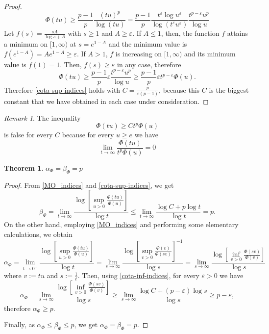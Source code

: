 \documentclass[twoside]{article}
\newtheorem{thm}{Theorem}[section]
\theoremstyle{remark}
\newtheorem{comentario}{Remark}
\renewcommand{\leq}{\leqslant}
\renewcommand{\geq}{\geqslant}
\begin{document}
\begin{proof}
\[
  \Phi(tu)
  \geq
  \frac{p-1}{p}\frac{(tu)^p}{\log(tu)}
  =
  \frac{p-1}{p}
  \frac{t^{\varepsilon} \log u^{\varepsilon}}{\log(t^{\varepsilon}u^{\varepsilon})}
  \frac{t^{p-\varepsilon}u^p}{\log u}
\]
Let $f(s)=\frac{sA}{\log s+A}$ with $s\geq 1$ and $A\geq \varepsilon$.  If $A\leq 1$, then, the function $f$ attains a minimum on $[1,\infty)$ at $s=e^{1-A}$ and the minimum value is $f(e^{1-A})=Ae^{1-A}\geq \varepsilon$. If $A> 1$, $f$ is increasing  on $[1,\infty)$ and its minimum value is $f(1)=1$. Then, $f(s)\geq \varepsilon$ in any case,   therefore
\[
\Phi(tu)\geq \frac{p-1}{p}\varepsilon \frac{t^{p-\varepsilon}u^p}{\log u}\geq
\frac{p-1}{p}\varepsilon t^{p-\varepsilon}\Phi(u).
\]
Therefore \eqref{cota-sup-indices} holds with $C=\frac{p}{\varepsilon (p-1)}$, because this $C$ is the biggest constant that we have obtained in each case under consideration.
\end{proof}



\begin{comentario}
The inequality 
\[
\Phi(tu)\geq Ct^p\Phi(u)
\] 
is false for every $C$ because for every $u\geq e$ we have 
\[
\lim\limits_{t \to \infty}\frac{\Phi(tu)}{t^p\Phi(u)}=0
\]
\end{comentario}






\begin{thm}
$\alpha_{\Phi}=\beta_{\Phi}=p$
\end{thm}

\begin{proof}
From \eqref{MO_indices} and \eqref{cota-sup-indices}, we get 
\[
\beta_{\Phi}=\lim\limits_{t \to \infty} \frac{\log\left[\sup\limits_{u>0} \frac{\Phi(tu)}{\Phi(u)}\right]}{\log t}
\leq
\lim \limits_{t \to \infty} \frac{\log C+p\log t}{\log t}=p.
\]
On the other hand, employing \eqref{MO_indices} and performing some elementary calculations, we obtain
\[
\alpha_{\Phi}=
\lim\limits_{t \to 0^+} \frac{\log\left[\sup\limits_{u>0} \frac{\Phi(tu)}{\Phi(u)}\right]}{\log t}=
\lim\limits_{s \to \infty} \frac{\log\left[\sup\limits_{v>0} \frac{\Phi(v)}{\Phi(sv)}\right]^{-1}}{\log s}=
\lim\limits_{s \to \infty} \frac{\log\left[\inf\limits_{v>0} \frac{\Phi(sv)}{\Phi(v)}\right]}{\log s}
\]
where $v:=tu$ and $s:=\frac{1}{t}$.
Then, using \eqref{cota-inf-indices},  for every $\varepsilon>0$ we have
\[
\alpha_{\Phi}=
\lim\limits_{s \to \infty} \frac{\log\left[\inf\limits_{v>0} \frac{\Phi(sv)}{\Phi(v)}\right]}{\log s}\geq
\lim\limits_{s \to \infty} \frac{\log C+(p-\varepsilon)\log s}{\log s}\geq p-\varepsilon,
\]
therefore $\alpha_{\Phi}\geq p$. 

Finally, as $\alpha_{\Phi}\leq \beta_{\Phi}\leq p$, we get  
$\alpha_{\Phi}=\beta_{\Phi}=p$.
\end{proof}
\end{document}
